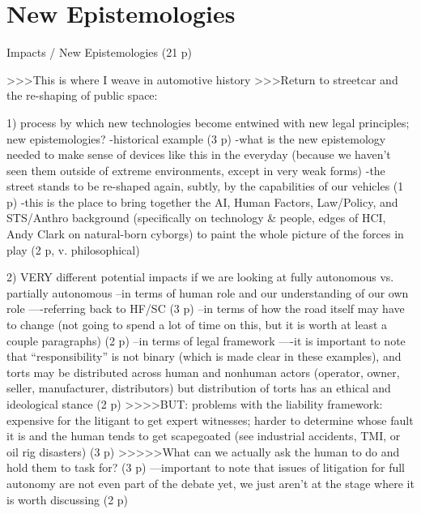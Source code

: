 \chapter{New Epistemologies}

Impacts / New Epistemologies (21 p)

>>>This is where I weave in automotive history 
>>>Return to streetcar and the re-shaping of public space: 

1) process by which new technologies become entwined with new legal
principles; new epistemologies?
-historical example (3 p)
-what is the new epistemology needed to make sense of devices like
this in the everyday (because we haven't seen them outside of extreme
environments, except in very weak forms)
-the street stands to be re-shaped again, subtly, by the capabilities
of our vehicles (1 p)
-this is the place to bring together the AI, Human Factors,
Law/Policy, and STS/Anthro background (specifically on technology &
people, edges of HCI, Andy Clark on natural-born cyborgs) to paint the
whole picture of the forces in play (2 p, v. philosophical)

2) VERY different potential impacts if we are looking at fully
autonomous vs. partially autonomous 
--in terms of human role and our understanding of our own role
----referring back to HF/SC (3 p)
--in terms of how the road itself may have to change (not going to
spend a lot of time on this, but it is worth at least a couple
paragraphs) (2 p)
--in terms of legal framework
----it is important to note that ``responsibility'' is not binary
(which is made clear in these examples), and torts may be distributed
across human and nonhuman actors (operator, owner, seller,
manufacturer, distributors) but distribution of torts has an ethical
and ideological stance (2 p)
>>>>BUT: problems with the liability framework: expensive for the
litigant to get expert witnesses; harder to determine whose fault it
is and the human tends to get scapegoated (see industrial accidents,
TMI, or oil rig disasters) (3 p)
>>>>>What can we actually ask the human to do and hold them to task
for? (3 p)
---important to note that issues of litigation for full autonomy are
not even part of the debate yet, we just aren't at the stage where it
is worth discussing (2 p)

